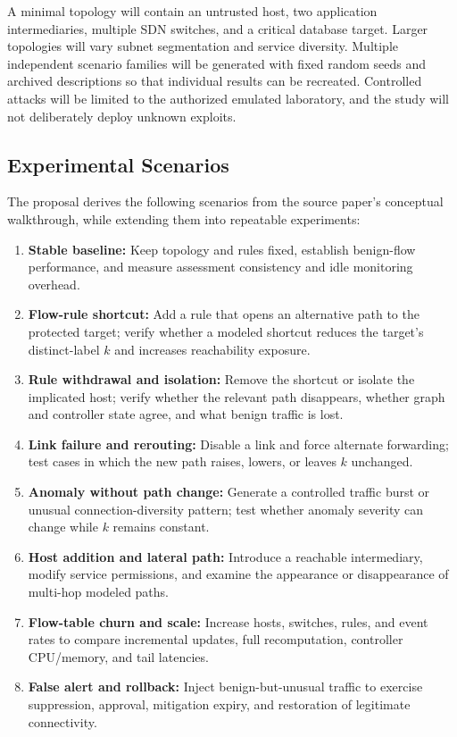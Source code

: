 \documentclass[12pt,a4paper,oneside]{article}
\begin{document}
A minimal topology will contain an untrusted host, two application intermediaries, multiple SDN switches, and a critical database target. Larger topologies will vary subnet segmentation and service diversity. Multiple independent scenario families will be generated with fixed random seeds and archived descriptions so that individual results can be recreated. Controlled attacks will be limited to the authorized emulated laboratory, and the study will not deliberately deploy unknown exploits.

\subsection{Experimental Scenarios}
The proposal derives the following scenarios from the source paper's conceptual walkthrough, while extending them into repeatable experiments:
\begin{enumerate}[label=\textbf{S\arabic*.}]
\item \textbf{Stable baseline:} Keep topology and rules fixed, establish benign-flow performance, and measure assessment consistency and idle monitoring overhead.
\item \textbf{Flow-rule shortcut:} Add a rule that opens an alternative path to the protected target; verify whether a modeled shortcut reduces the target's distinct-label $k$ and increases reachability exposure.
\item \textbf{Rule withdrawal and isolation:} Remove the shortcut or isolate the implicated host; verify whether the relevant path disappears, whether graph and controller state agree, and what benign traffic is lost.
\item \textbf{Link failure and rerouting:} Disable a link and force alternate forwarding; test cases in which the new path raises, lowers, or leaves $k$ unchanged.
\item \textbf{Anomaly without path change:} Generate a controlled traffic burst or unusual connection-diversity pattern; test whether anomaly severity can change while $k$ remains constant.
\item \textbf{Host addition and lateral path:} Introduce a reachable intermediary, modify service permissions, and examine the appearance or disappearance of multi-hop modeled paths.
\item \textbf{Flow-table churn and scale:} Increase hosts, switches, rules, and event rates to compare incremental updates, full recomputation, controller CPU/memory, and tail latencies.
\item \textbf{False alert and rollback:} Inject benign-but-unusual traffic to exercise suppression, approval, mitigation expiry, and restoration of legitimate connectivity.
\end{enumerate}
\end{document}
